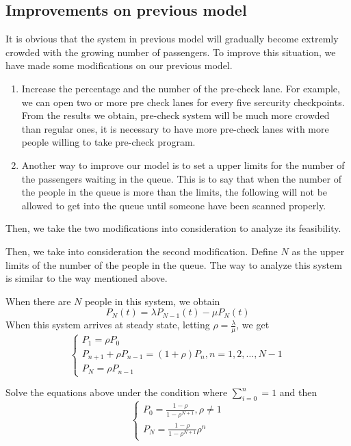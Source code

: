 \documentclass{mcmthesis}
\begin{document}
\subsection{Improvements on previous model}
	It is obvious that the system in previous model will gradually become extremly crowded with the growing number of passengers. To improve this situation, we have made some modifications on our previous model. 
	\begin{enumerate}
		\item Increase the percentage and the number of the pre-check lane. For example, we can open two or more pre check lanes for every five sercurity checkpoints. From the results we obtain, pre-check system will be much more crowded than regular ones, it is necessary to have more pre-check lanes with more people willing to take pre-check program.
		\item Another way to improve our model is to set a upper limits for the number of the passengers waiting in the queue. This is to say that when the number of the people in the queue is more than the limits, the following will not be allowed to get into the queue until someone have been scanned properly.
	\end{enumerate}
	
	Then, we take the two modifications into consideration to analyze its feasibility.

Then, we take into consideration the second modification. Define ${N}$ as the upper limits of the number of the people in the queue. The way to analyze this system is similar to the way mentioned above.
	
	When there are ${N}$ people in this system, we obtain
		\begin{equation}
			P_N(t) = \lambda P_{N-1}(t) - \mu P_N(t)
		\end{equation}
	When this system arrives at steady state, letting ${\rho = \frac {\lambda}{\mu}}$, we get
\begin{equation}    
\left  \{
       \begin{array}{lr}
           P_1 = \rho P_0\\
            P_{n+1} + \rho P_{n-1} = (1 +\rho )P_n, n=1,2,\dots,N-1\\
            P_N = \rho P_{n-1}
        \end{array}
\right.
\end{equation}

	Solve the equations above under the condition where ${\sum\limits_{i=0}^{n} = 1}$ and then
	\begin{equation}    
\left  \{
       \begin{array}{lr}
            P_0 = \frac {1 - \rho}{1 - \rho ^{N+1}} , \rho \ne 1\\
            P_N = \frac{1 - \rho}{1 - \rho ^{N+1}} \rho ^{n}
        \end{array}
\right.
\end{equation}
\end{document}
